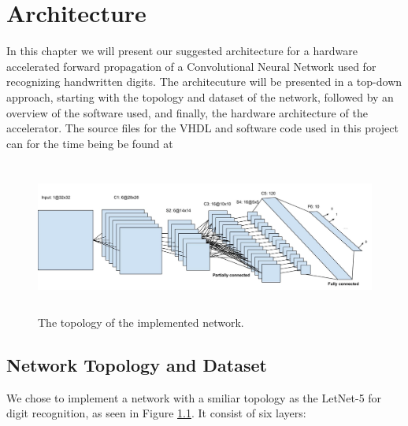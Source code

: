 \chapter{Architecture} \label{architecture}

In this chapter we will present our suggested architecture for a hardware accelerated forward propagation of a Convolutional Neural Network used for recognizing handwritten digits. The architecuture will be presented in a top-down approach, starting with the topology and dataset of the network, followed by an overview of the software used, and finally, the hardware architecture of the accelerator. The source files for the VHDL and software code used in this project can for the time being be found at \cite{MyGithub}

\begin{figure}[h!]
  \centering
      \includegraphics[width=1.2\textwidth, height=5cm]{Figures/Method/Network_topology}
    \caption{The topology of the implemented network.}
    \label{fig_network_topology}
\end{figure}

\section{Network Topology and Dataset}

We chose to implement a network with a smiliar topology as the LetNet-5 for digit recognition, as seen in Figure \ref{fig_network_topology}. It consist of six layers: 

